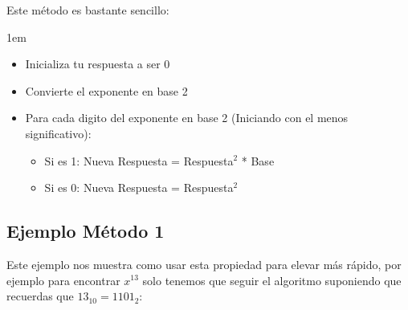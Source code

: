 \documentclass[12pt]{report}                                    %
\newenvironment{SmallIndentation}[1][0.75em]                    %
    {\begin{adjustwidth}{#1}{}\begin{footnotesize}}                 %
    {\end{footnotesize}\end{adjustwidth}}                           %
\begin{document}
            Este método es bastante sencillo:

            \begin{SmallIndentation}[1em]
                
                \begin{itemize}
                    \item   Inicializa tu respuesta a ser 0
                    \item   Convierte el exponente en base 2

                    \item Para cada digito del exponente en base 2 (Iniciando con
                          el menos significativo):
                        
                        \begin{itemize}
                            \item Si es 1: Nueva Respuesta = Respuesta$^2$ * Base 
                            \item Si es 0: Nueva Respuesta = Respuesta$^2$ 
                        \end{itemize}
                \end{itemize}

            \end{SmallIndentation}


            


        \subsection*{Ejemplo Método 1}



            Este ejemplo nos muestra como usar esta propiedad para elevar más rápido, por ejemplo para encontrar
            $x^{13}$ solo tenemos que seguir el algoritmo suponiendo que recuerdas que $13_{10} = 1101_{2}$:
\end{document}
